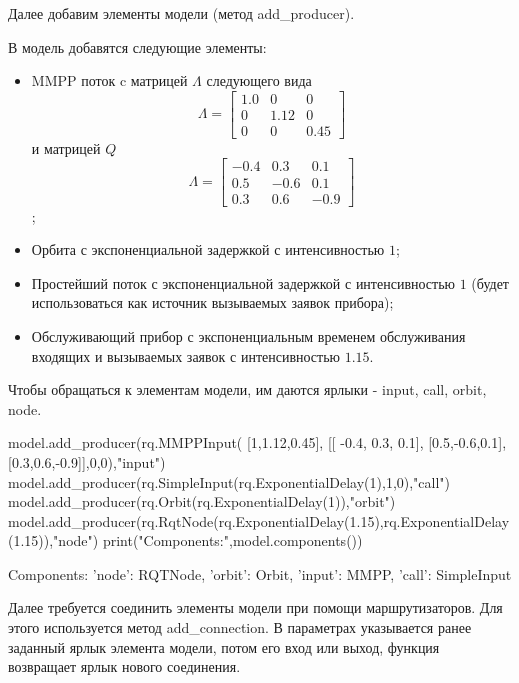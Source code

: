 Далее добавим элементы модели (метод add\_producer). 

В модель добавятся следующие элементы: 
\begin{itemize}
	\item MMPP поток c матрицей $\Lambda$ следующего вида
		\begin{equation*}
			\Lambda =  \begin{bmatrix}
			1.0 & 0 &  0\\
			0 & 1.12 & 0\\
			0 & 0 &	0.45
			\end{bmatrix}
		\end{equation*} и матрицей $Q$
		\begin{equation*}
			\Lambda =  \begin{bmatrix}
				-0.4 & 0.3 &  0.1\\
				0.5 & -0.6 & 0.1\\
				0.3 & 0.6 &	-0.9
			\end{bmatrix}
		\end{equation*};
	\item Орбита с экспоненциальной задержкой с интенсивностью $1$;
	\item Простейший поток с экспоненциальной задержкой с интенсивностью $1$ (будет использоваться как источник вызываемых заявок прибора);
	\item Обслуживающий прибор с экспоненциальным временем обслуживания входящих и вызываемых заявок с интенсивностью $1.15$.
\end{itemize}
Чтобы обращаться к элементам модели, им даются ярлыки - input, call, orbit, node.


\begin{pyin}
model.add_producer(rq.MMPPInput(
[1,1.12,0.45],
[[ -0.4, 0.3, 0.1],
[0.5,-0.6,0.1],
[0.3,0.6,-0.9]],0,0),"input")
model.add_producer(rq.SimpleInput(rq.ExponentialDelay(1),1,0),"call")
model.add_producer(rq.Orbit(rq.ExponentialDelay(1)),"orbit")
model.add_producer(rq.RqtNode(rq.ExponentialDelay(1.15),rq.ExponentialDelay(1.15)),"node")
print("Components:",model.components())
\end{pyin}

\begin{pyout}
	Components: {'node': RQTNode, 'orbit': Orbit, 'input': MMPP, 'call': SimpleInput}
\end{pyout}

Далее требуется соединить элементы модели при помощи маршрутизаторов. Для этого используется метод add\_connection. В параметрах указывается ранее заданный ярлык элемента модели, потом его вход или выход, функция возвращает ярлык нового соединения.

